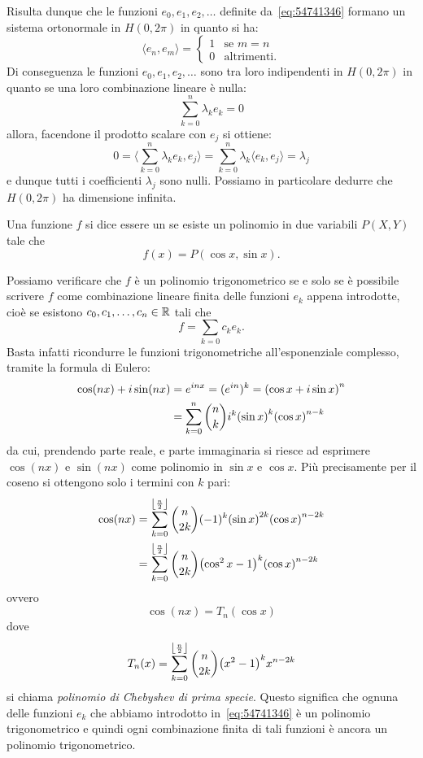 Risulta dunque che le funzioni $e_0,e_1,e_2,\dots$ definite da~\eqref{eq:54741346}
formano un sistema ortonormale in $H(0,2\pi)$
in quanto si ha:
\[
  \langle e_n, e_m \rangle =
  \begin{cases} 1 &\text{se $m=n$}\\
  0 & \text{altrimenti}.
  \end{cases}
\]
Di conseguenza le funzioni $e_0,e_1,e_2, \dots$ sono tra loro indipendenti
in $H(0,2\pi)$ in quanto se una loro combinazione lineare è nulla:
\[
  \sum_{k=0}^n \lambda_k e_k = 0
\]
allora, facendone il prodotto scalare con $e_j$ si ottiene:
\[
  0 = \langle \sum_{k=0}^n \lambda_k e_k , e_j\rangle
  = \sum_{k=0}^n \lambda_k \langle e_k, e_j\rangle
  = \lambda_j
\]
e dunque tutti i coefficienti $\lambda_j$ sono nulli.
Possiamo in particolare dedurre che $H(0,2\pi)$ ha dimensione
infinita.

\begin{definition}
Una funzione $f$ si dice essere un 
se esiste un polinomio in due variabili $P(X,Y)$ tale che
\[
  f(x) = P(\cos x, \sin x).
\]
\end{definition}

Possiamo verificare che $f$ è un polinomio trigonometrico se e solo se
è possibile scrivere $f$ come combinazione lineare finita delle funzioni $e_k$
appena introdotte,
cioè se esistono $c_0, c_1, \dots, c_n\in \mathbb R$ tali che
\[
  f = \sum_{k=0} c_k e_k.
\]
Basta infatti ricondurre le funzioni trigonometriche all'esponenziale complesso,
tramite la formula di Eulero:
\begin{align*}
   \cos(nx) + i \sin(nx)
   &= e^{inx} = (e^{in})^k
   = {\left( \cos x + i \sin x \right)}^n\\
   &= \sum_{k=0}^n {n \choose k} i^k {\left( \sin x \right)}^k {\left( \cos x \right)}^{n-k}
\end{align*}
da cui, prendendo parte reale, e parte immaginaria si
riesce ad esprimere $\cos(nx)$ e $\sin(nx)$ come polinomio in $\sin x$ e $\cos x$.
Più precisamente per il coseno
si ottengono solo i termini con $k$ pari:
\begin{align*}
\cos(nx) &= \sum_{k=0}^{\left\lfloor \frac n 2 \right\rfloor} {n \choose 2k} (-1)^k {\left( \sin x \right)}^{2k} {\left( \cos x \right)}^{n-2k}\\
&= \sum_{k=0}^{\left\lfloor \frac n 2 \right\rfloor}{n \choose 2k} {\left( \cos^2 x -1 \right)}^k {\left( \cos x \right)}^{n-2k}
\end{align*}
ovvero
\[
  \cos(nx) = T_n(\cos x)
\]
dove
\[
  T_n(x) = \sum_{k=0}^{\left\lfloor \frac n 2 \right\rfloor}{n \choose 2k} {\left( x^2 -1 \right)}^k x^{n-2k}
\]
si chiama \emph{polinomio di Chebyshev di prima specie}.
%
%
Questo significa che ognuna delle funzioni $e_k$ che abbiamo introdotto
in~\eqref{eq:54741346} è un polinomio trigonometrico e quindi ogni
combinazione finita di tali funzioni è ancora un polinomio trigonometrico.

